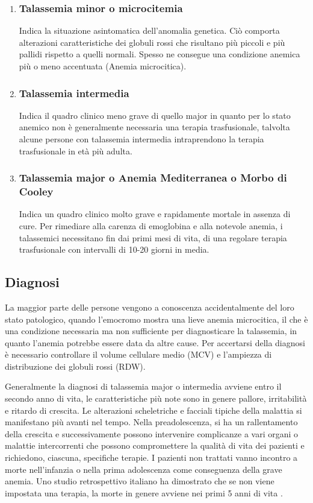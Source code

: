 \documentclass[12pt,a4paper,openright,twoside]{report}
\begin{document}
\begin{enumerate}
\item \subsubsection{Talassemia minor o microcitemia} Indica la situazione asintomatica dell'anomalia genetica. Ciò comporta alterazioni caratteristiche dei globuli rossi che risultano più piccoli e più pallidi rispetto a quelli normali.
Spesso ne consegue una condizione anemica più o meno accentuata (Anemia microcitica).
\item \subsubsection{Talassemia intermedia} Indica il quadro clinico meno grave di quello major in quanto per lo stato anemico non è generalmente necessaria una terapia trasfusionale, talvolta alcune persone con talassemia intermedia intraprendono la terapia trasfusionale in età più adulta.
\item \subsubsection{Talassemia major o Anemia Mediterranea o Morbo di Cooley} 
Indica un quadro clinico molto grave e rapidamente mortale in assenza di cure. Per rimediare alla carenza di emoglobina e alla notevole anemia, i talassemici necessitano fin dai primi mesi di vita, di una regolare terapia trasfusionale con intervalli di 10-20 giorni in media\cite{talassemicipiemonte}. 
\end{enumerate}

\subsection{Diagnosi}
La maggior parte delle persone vengono a conoscenza accidentalmente del loro stato patologico, quando l'emocromo mostra una lieve anemia microcitica, il che è una condizione necessaria ma non sufficiente per diagnosticare la talassemia, in quanto l'anemia potrebbe essere data da altre cause. Per accertarsi della diagnosi è necessario controllare il volume cellulare medio (MCV) e l'ampiezza di distribuzione dei globuli rossi (RDW)\cite{muncie2009alpha}.

Generalmente la diagnosi di talassemia major o intermedia avviene entro il secondo anno di vita, le caratteristiche più note sono in genere pallore, irritabilità e ritardo di crescita. Le alterazioni scheletriche e facciali tipiche della malattia si manifestano più avanti nel tempo. Nella preadolescenza, si ha un rallentamento della crescita e successivamente possono intervenire complicanze a vari organi o malattie intercorrenti che possono compromettere la qualità di vita dei pazienti e richiedono, ciascuna, specifiche terapie. I pazienti non trattati vanno incontro a morte nell'infanzia o nella prima adolescenza come conseguenza della grave anemia. Uno studio retrospettivo italiano ha dimostrato che se non viene impostata una terapia, la morte in genere avviene nei primi 5 anni di vita \cite{atzeni2002beta}\cite{screening1975}.
\end{document}
